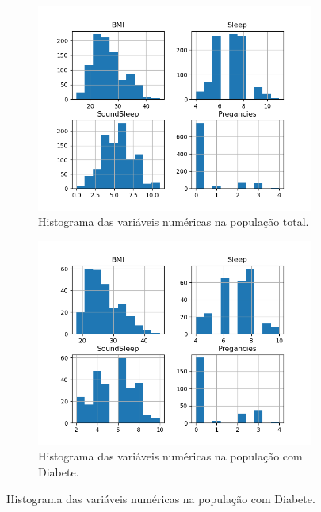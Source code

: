 \begin{figure}[H]
     \centering
     \begin{subfigure}[b]{0.3\textwidth}
         \ \caption{Histograma das variáveis numéricas na população total.}
 \label{fig:var:1:diab}
 \centering
\includegraphics[scale=0.3]{images/hist_diabete.png}
     \end{subfigure}
     \hfill
     \begin{subfigure}[b]{0.3\textwidth}
         \centering
         \caption{Histograma das variáveis numéricas na população com Diabete.}
 \label{fig:var:2:diab}
 \centering
\includegraphics[scale=0.3]{images/hist_diabete_yes.png}
     \end{subfigure}
     \hfill

\end{figure}
